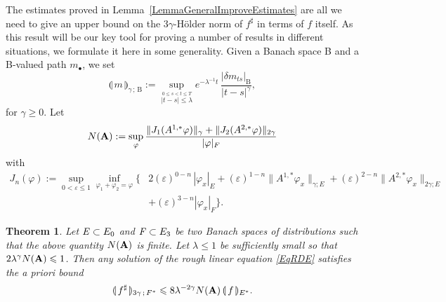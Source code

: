 \documentclass[11pt,a4paper]{amsart}
\renewcommand{\leq}{\leqslant}
\renewcommand{\geq}{\geqslant}
\newcommand{\ssk}{\smallskip}
\newtheorem{thm}{\hspace{-0.15cm}  {\sc Theorem} } %
\numberwithin{equation}{section} %
\begin{document}
The estimates proved in Lemma~\ref{LemmaGeneralImproveEstimates} are all we need to give an upper bound on the $3\gamma$-H\"older norm of $f^\sharp$ in terms of $f$ itself. As this result will be our key tool for proving a number of results in different situations, we formulate it here in some generality. Given a Banach space B and a B-valued path $m_\bullet$, we set
$$
\llparenthesis\,m\,\rrparenthesis_{\gamma\,;\,\textrm{B}} := \sup_{\stackrel{0\leq s<t\leq T}{{|t-s|\le \lambda}}}e^{-\lambda^{-1}t}\,\frac{\big| \delta m_{ts} \big|_\textrm{B}}{|t-s|^\gamma},
$$
for $\gamma\geq 0$. Let
$$
N({\bf A}) := \sup_\varphi \frac{\|J_1(A^{1,*}\varphi)\|_\gamma + \|J_2(A^{2,*}\varphi)\|_{2\gamma}}{|\varphi|_F}
$$ 
with
\begin{equation*}
\begin{split}
J_n(\varphi) :=
\sup_{0 < \varepsilon \leq 1} \inf_{\varphi_1+\varphi_2=\varphi} \Big\{&   2
 ( \varepsilon)^{0-n} \, | \varphi_x|_E
  +  (\varepsilon)^{1-n} \| A^{1,*}\varphi_x \|_{\gamma;E}  
 + ( \varepsilon)^{2-n}\|A^{2,*} \varphi_x\|_{2\gamma;E} 
 \\ &
  +  ( \varepsilon)^{3-n}| \varphi_x |_F 
  \Big\} .
\end{split}
\end{equation*}

\ssk

\begin{thm}
\label{ThmGeneralRegularityGain} 
Let $\textrm{\emph{E}}\subset E_0$ and $\textrm{\emph{F}}\subset E_3$ be two Banach spaces of distributions such that the above quantity $N({\bf A})$ is finite. Let  $\lambda \leq 1$ be sufficiently small so that $2\lambda^{\gamma} N({\bfA}) \leq 1$. Then any solution of the rough linear equation \eqref{EqRDE} satisfies the a priori bound 
$$
\llparenthesis\, f^\sharp\,\rrparenthesis_{3\gamma\,;\,F^*} \leq 8 \lambda^{-2\gamma} N({\bfA})\,\llparenthesis\,f\,\rrparenthesis_{E^*}. 
$$
\end{thm}

\ssk
\end{document}
